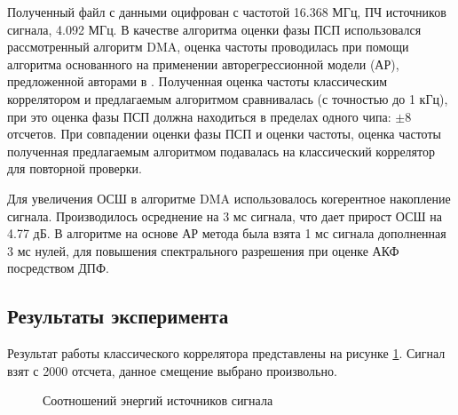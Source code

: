Полученный файл с данными оцифрован с частотой 16.368 МГц, ПЧ источников сигнала, 4.092 МГц. В качестве алгоритма оценки фазы ПСП использовался рассмотренный алгоритм DMA,
оценка частоты проводилась при помощи алгоритма основанного на применении авторегрессионной модели (АР), предложенной авторами в \cite{my_otchet}. Полученная оценка
частоты классическим коррелятором и предлагаемым алгоритмом сравнивалась (с точностью до 1 кГц), при это оценка фазы ПСП должна находиться в пределах одного чипа: ${\pm 8}$
отсчетов. При совпадении оценки фазы ПСП и оценки частоты, оценка частоты полученная предлагаемым алгоритмом подавалась на классический коррелятор для повторной проверки.

Для увеличения ОСШ в алгоритме DMA использовалось когерентное накопление сигнала. Производилось осреднение на 3 мс сигнала, что дает прирост ОСШ на 4.77 дБ.
В алгоритме на основе АР метода была взята 1 мс сигнала дополненная 3 мс нулей, для повышения спектрального разрешения при оценке АКФ посредством ДПФ.

\subsection{Результаты эксперимента}

Результат работы классического коррелятора представлены на рисунке \ref{pic:16mhz_sats_all}. Сигнал взят с 2000 отсчета, данное смещение выбрано произвольно.
\begin{figure}[h]
\center{}
	\caption{Соотношений энергий источников сигнала}
	\label{pic:16mhz_sats_all}
\end{figure}


